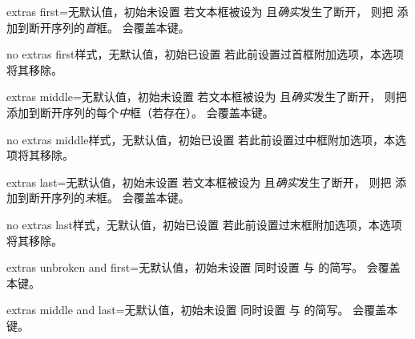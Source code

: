 \begin{docTcbKey}[][doc new=2015-07-16]{extras first}{=}{无默认值，初始未设置}
  若文本框被设为  且\emph{确实}发生了断开，
  则把  添加到断开序列的\emph{首}框。
   会覆盖本键。
\end{docTcbKey}

\begin{docTcbKey}[][doc new=2015-07-16]{no extras first}{}{样式，无默认值，初始已设置}
  若此前设置过首框附加选项，本选项将其移除。
\end{docTcbKey}

\begin{docTcbKey}[][doc new=2015-07-16]{extras middle}{=}{无默认值，初始未设置}
  若文本框被设为  且\emph{确实}发生了断开，
  则把  添加到断开序列的每个\emph{中}框（若存在）。
   会覆盖本键。
\end{docTcbKey}

\begin{docTcbKey}[][doc new=2015-07-16]{no extras middle}{}{样式，无默认值，初始已设置}
  若此前设置过中框附加选项，本选项将其移除。
\end{docTcbKey}

\begin{docTcbKey}[][doc new=2015-07-16]{extras last}{=}{无默认值，初始未设置}
  若文本框被设为  且\emph{确实}发生了断开，
  则把  添加到断开序列的\emph{末}框。
   会覆盖本键。
\end{docTcbKey}

\begin{docTcbKey}[][doc new=2015-07-16]{no extras last}{}{样式，无默认值，初始已设置}
  若此前设置过末框附加选项，本选项将其移除。
\end{docTcbKey}

\clearpage

\begin{docTcbKey}[][doc new=2015-07-16]{extras unbroken and first}{=}{无默认值，初始未设置}
  同时设置  与
   的简写。
   会覆盖本键。
\end{docTcbKey}

\begin{docTcbKey}[][doc new=2015-07-16]{extras middle and last}{=}{无默认值，初始未设置}
  同时设置  与
   的简写。
   会覆盖本键。
\end{docTcbKey}

